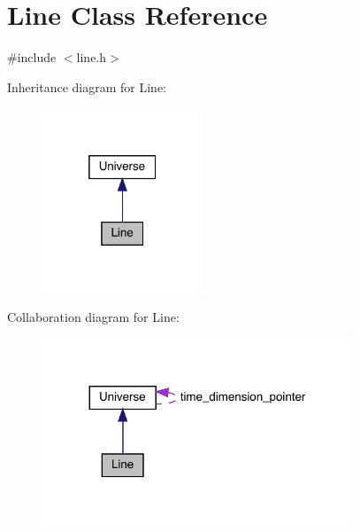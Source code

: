 \hypertarget{class_line}{}\section{Line Class Reference}
\label{class_line}


{\ttfamily \#include $<$line.\+h$>$}



Inheritance diagram for Line\+:\nopagebreak
\begin{figure}[H]
\begin{center}
\leavevmode
\includegraphics[width=136pt]{class_line__inherit__graph}
\end{center}
\end{figure}


Collaboration diagram for Line\+:
\nopagebreak
\begin{figure}[H]
\begin{center}
\leavevmode
\includegraphics[width=263pt]{class_line__coll__graph}
\end{center}
\end{figure}
